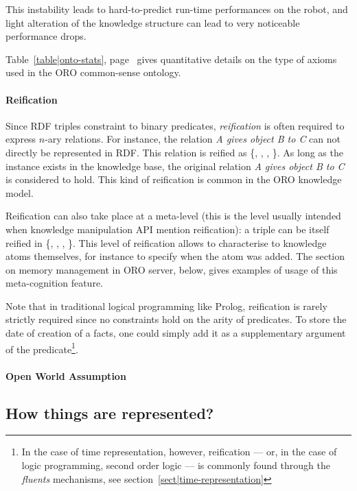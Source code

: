 This instability leads to hard-to-predict run-time performances on the robot,
and light alteration of the knowledge structure can lead to very noticeable
performance drops.

Table~\ref{table|onto-stats}, page~\pageref{table|onto-stats} gives
quantitative details on the type of axioms used in the ORO common-sense
ontology.

\paragraph{Reification} Since RDF triples constraint to binary predicates,
\emph{reification} is often required to express $n$-ary relations. For
instance, the relation \emph{A gives object B to C} can not directly be
represented in RDF. This relation is reified as \{,
, , \}. As
long as the instance  exists in the knowledge base, the original
relation \emph{A gives object B to C} is considered to hold. This kind of
reification is common in the ORO knowledge model.

Reification can also take place at a meta-level (this is the level usually
intended when knowledge manipulation API mention reification): a triple
 can be itself reified in \{, , , \}. This level of reification allows
to characterise to knowledge atoms themselves, for instance to specify when the
atom was added. The section on memory management in ORO server, below, gives
examples of usage of this meta-cognition feature.

Note that in traditional logical programming like Prolog, reification is rarely
strictly required since no constraints hold on the arity of predicates. To
store the date of creation of a facts, one could simply add it as a
supplementary argument of the predicate\footnote{In the case of time
representation, however, reification --- or, in the case of logic programming,
second order logic --- is commonly found through the \emph{fluents} mechanisms,
see section~\ref{sect|time-representation}}.

\paragraph{Open World Assumption}

\subsection{How things are represented?}

